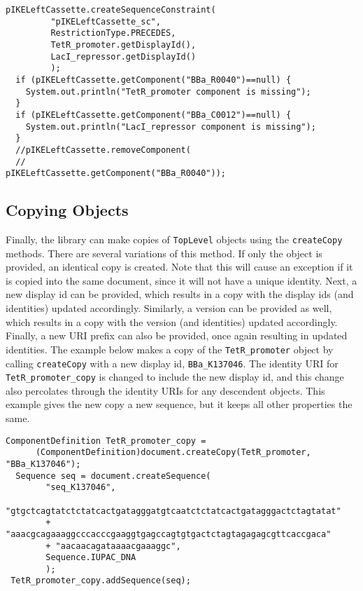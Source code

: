 \begin{minipage}{0.95\textwidth} 
\begin{lstlisting}[basicstyle=\footnotesize\ttfamily]
  pIKELeftCassette.createSequenceConstraint(
         "pIKELeftCassette_sc",
         RestrictionType.PRECEDES,
         TetR_promoter.getDisplayId(), 
         LacI_repressor.getDisplayId()
         );
  if (pIKELeftCassette.getComponent("BBa_R0040")==null) {
	System.out.println("TetR_promoter component is missing");
  }
  if (pIKELeftCassette.getComponent("BBa_C0012")==null) {
	System.out.println("LacI_repressor component is missing");
  }
  //pIKELeftCassette.removeComponent(
  //                          pIKELeftCassette.getComponent("BBa_R0040"));
\end{lstlisting}
\end{minipage}

\subsection*{Copying Objects}

Finally, the library can make copies of \lstinline+TopLevel+ objects using the \lstinline+createCopy+ methods.  There are several variations of this method.  If only the object is provided, an identical copy is created.  Note that this will cause an exception if it is copied into the same document, since it will not have a unique identity.  Next, a new display id can be provided, which results in a copy with the display ids (and identities) updated accordingly.  Similarly, a version can be provided as well, which results in a copy with the version (and identities) updated accordingly.  Finally, a new URI prefix can also be provided, once again resulting in updated identities.  The example below makes a copy of the
\lstinline+TetR_promoter+ object by calling \lstinline+createCopy+ with a new display id, \lstinline+BBa_K137046+. The identity URI for \lstinline+TetR_promoter_copy+ is changed to include the new display id, and this change also percolates through the identity URIs for any descendent objects.  This example gives the new copy a new sequence, but it keeps all other properties the same. 

\begin{minipage}{0.95\textwidth} 
\begin{lstlisting}[basicstyle=\footnotesize\ttfamily]
  ComponentDefinition TetR_promoter_copy = 
      (ComponentDefinition)document.createCopy(TetR_promoter, "BBa_K137046");
  Sequence seq = document.createSequence(
 		"seq_K137046",
		"gtgctcagtatctctatcactgatagggatgtcaatctctatcactgatagggactctagtatat"
		+ "aaacgcagaaaggcccacccgaaggtgagccagtgtgactctagtagagagcgttcaccgaca"
		+ "aacaacagataaaacgaaaggc",
		Sequence.IUPAC_DNA
		);	
 TetR_promoter_copy.addSequence(seq);
\end{lstlisting}
\end{minipage}

